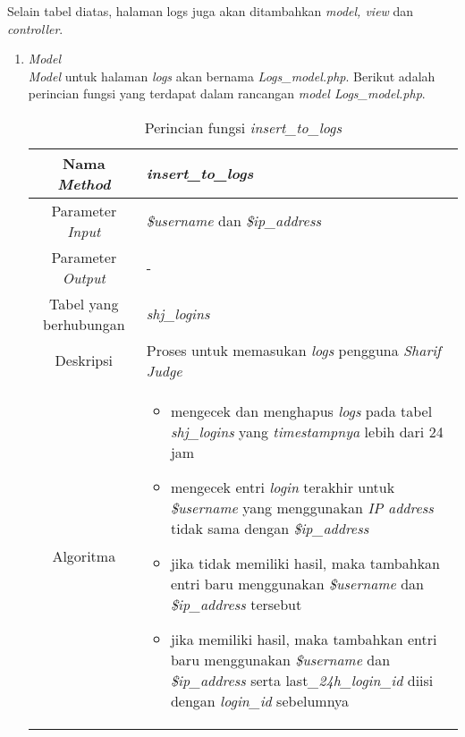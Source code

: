 Selain tabel diatas, halaman logs juga akan ditambahkan \textit{model, view} dan \textit{controller}.
\begin{enumerate}
	\item \textit{Model} \\
	\textit{Model} untuk halaman \textit{logs} akan bernama \textit{Logs\_model.php}. Berikut adalah perincian fungsi yang terdapat dalam rancangan \textit{model Logs\_model.php}.
	\begin{table}[H]
		\caption{Perincian fungsi \textit{insert\_to\_logs}}
		\begin{tabular}{|c|p{11cm}|}
			\hline
			Nama \textit{Method} 	& 	\textit{insert\_to\_logs} 	\\
			\hline
			Parameter \textit{Input} & \textit{\$username} dan \textit{\$ip\_address} \\
			\hline
			Parameter \textit{Output} & -\\
			\hline
			Tabel yang berhubungan & \textit{shj\_logins} \\
			\hline
			Deskripsi	& Proses untuk memasukan \textit{logs} pengguna \textit{Sharif Judge} \\
			\hline
			Algoritma	& \begin{itemize}
				\item mengecek dan menghapus \textit{logs} pada tabel \textit{shj\_logins} yang \textit{timestampnya} lebih dari 24 jam
				\item mengecek entri \textit{login} terakhir untuk \textit{\$username} yang  menggunakan \textit{IP address} tidak sama dengan \textit{\$ip\_address}
				\item jika tidak memiliki hasil, maka tambahkan entri baru menggunakan \textit{\$username} dan \textit{\$ip\_address} tersebut
				\item jika memiliki hasil,  maka tambahkan entri baru menggunakan \textit{\$username} dan \textit{\$ip\_address} serta last\textit{\_24h\_login\_id} diisi dengan \textit{login\_id} sebelumnya
			\end{itemize} \\
			\hline
		\end{tabular}
	\end{table}


\end{enumerate}
